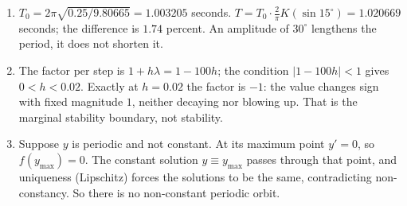 \begin{enumerate}[label=\textbf{16.\arabic*}]
  \item $T_{0}=2\pi\sqrt{0.25/9.80665}=1.003205$ seconds.
        $T=T_{0}\cdot\tfrac{2}{\pi}K(\sin15^{\circ})=1.020669$ seconds; the difference is
        $1.74$ percent. An amplitude of $30^{\circ}$ lengthens the period, it does not
        shorten it.

  \item The factor per step is $1+h\lambda=1-100h$; the condition $|1-100h|<1$ gives
        $0<h<0.02$. Exactly at $h=0.02$ the factor is $-1$: the value changes sign
        with fixed magnitude $1$, neither decaying nor blowing up. That is the
        marginal stability boundary, not stability.

  \item Suppose $y$ is periodic and not constant. At its maximum point $y'=0$, so
        $f(y_{\max})=0$. The constant solution $y\equiv y_{\max}$ passes through that
        point, and uniqueness (Lipschitz) forces the solutions to be the same,
        contradicting non-constancy. So there is no non-constant periodic orbit.
\end{enumerate}


